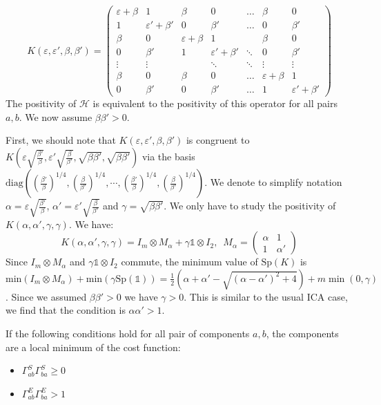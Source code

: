 \documentclass[12pt]{report}
\begin{document}
$$
K(\varepsilon, \varepsilon', \beta, \beta')=
\left(
    \begin{array}{ll|ll|l|ll}
\varepsilon + \beta & 1       & \beta & 0       & \dots  & \beta & 0       \\
1      & \varepsilon' + \beta' & 0      & \beta' & \dots  & 0      & \beta' \\
\hline
\beta & 0       & \varepsilon + \beta & 1       &        & \beta & 0       \\
0      & \beta' & 1      & \varepsilon' + \beta' & \ddots & 0      & \beta' \\
\hline
\vdots & \vdots  &        & \ddots  & \ddots & \vdots & \vdots  \\
\hline
\beta & 0       & \beta & 0       & \dots  & \varepsilon + \beta & 1       \\
0      & \beta' & 0      & \beta' & \dots  & 1      & \varepsilon' + \beta'
    \end{array}
\right)
$$
The positivity of $\mathcal{H}$ is equivalent to the positivity of this operator for all pairs $a, b$.
We now assume $\beta \beta' > 0$.

First, we should note that $K(\varepsilon, \varepsilon', \beta, \beta') $ is congruent to $K(\varepsilon \sqrt{\frac{\beta'}{\beta}}, \varepsilon' \sqrt{\frac{\beta}{\beta'}}, \sqrt{\beta\beta'}, \sqrt{\beta\beta'})$ via the basis $\text{diag}((\frac{\beta'}{\beta})^{1/4}, (\frac{\beta}{\beta'})^{1/4}, \cdots,(\frac{\beta'}{\beta})^{1/4}, (\frac{\beta}{\beta'})^{1/4})$.
%
We denote to simplify notation $\alpha = \varepsilon \sqrt{\frac{\beta'}{\beta}}$, $\alpha' = \varepsilon' \sqrt{\frac{\beta}{\beta'}}$ and $\gamma = \sqrt{\beta\beta'}$. We only have to study the positivity of $K(\alpha, \alpha', \gamma, \gamma)$.
We have:
$$
K(\alpha, \alpha', \gamma, \gamma) =  I_m  \otimes M_\alpha+ \gamma  \mathbb{1}\otimes I_2, \enspace M_\alpha = 
\begin{pmatrix}
\alpha & 1 \\
1 & \alpha'
\end{pmatrix}
$$
Since $I_m\otimes M_\alpha$ and $\gamma \mathbb{1}\otimes I_2$ commute, the minimum value of $\text{Sp}(K)$ is $\text{min}(I_m\otimes M_\alpha) + \text{min}(\gamma\text{Sp}(\mathbb{1}))=\frac12(\alpha + \alpha' - \sqrt{(\alpha - \alpha')^2 + 4}) + m\min(0, \gamma)$.
Since we assumed $\beta \beta' > 0$ we have $\gamma > 0$. This is similar to the usual ICA case, we find that the condition is $\alpha\alpha' > 1$.

If the following conditions hold for all pair of components $a, b$, the components are a local minimum of the cost function:
\begin{itemize}
    \item $\Gamma^S_{ab}\Gamma^S_{ba}\geq 0$
    \item $\Gamma^E_{ab}\Gamma^E_{ba} > 1$
\end{itemize}
\end{document}
